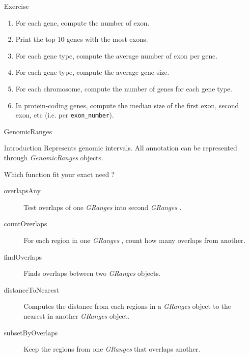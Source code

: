 \documentclass[10pt]{beamer}
\newcommand{\gr}{{\it GRanges} }
\begin{document}
\begin{frame}[fragile]{Exercise}
  \begin{enumerate}
  \item For each gene, compute the number of exon.
  \item Print the top 10 genes with the most exons.
  \item For each gene type, compute the average number of exon per gene.
  \item For each gene type, compute the average gene size.
  \item For each chromosome, compute the number of genes for each gene type.
  \item In protein-coding genes, compute the median size of the first exon, second exon, etc (i.e. per \verb!exon_number!).
  \end{enumerate}
\end{frame}

\begin{frame}[fragile]{GenomicRanges}
  \begin{block}{Introduction}
    Represents genomic intervals. All annotation can be represented through {\it GenomicRanges} objects.
  \end{block}
  \begin{block}{Which function fit your exact need ?}
    \begin{description}
    \item[overlapsAny] Test overlaps of one \gr into second \gr.
    \item[countOverlaps] For each region in one \gr, count how many overlaps from another.
    \item[findOverlaps] Finds overlaps between two {\it GRanges} objects.
    \item[distanceToNearest] Computes the distance from each regions in a {\it GRanges} object to the nearest in another {\it GRanges} object.
    \item[subsetByOverlaps] Keep the regions from one \gr that overlaps another.
    \end{description}
  \end{block}
\end{frame}
\end{document}
